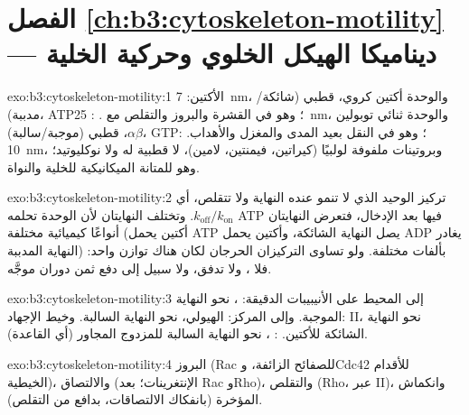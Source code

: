 \section*{الفصل \ref{ch:b3:cytoskeleton-motility} --- ديناميكا الهيكل الخلوي وحركية الخلية}

\begin{solution}{exo:b3:cytoskeleton-motility:1}
الأكتين: \qty{7}{nm}، والوحدة أكتين كروي، قطبي (شائكة/مدببة)، ATP؛
وهو في القشرة والبروز والتقلص مع . : \qty{25}{nm}،
والوحدة ثنائي توبولين $\alpha\beta$، قطبي (موجبة/سالبة)، GTP؛ وهو في النقل
بعيد المدى والمغزل والأهداب. : \qty{10}{nm}،
وبروتينات ملفوفة لولبيًا (كيراتين، فيمنتين، لامين)، لا قطبية له ولا نوكليوتيد؛
وهو للمتانة الميكانيكية للخلية والنواة.
\end{solution}

\begin{solution}{exo:b3:cytoskeleton-motility:2}
تركيز الوحيد الذي لا تنمو عنده النهاية ولا تتقلص،
أي $k_{\text{off}}/k_{\text{on}}$. وتختلف النهايتان لأن الوحدة
تحلمه ATP فيها بعد الإدخال، فتعرض النهايتان أنواعًا
كيميائية مختلفة (أكتين يحمل ATP يصل النهاية الشائكة، وأكتين يحمل ADP
يغادر النهاية المدببة) بألفات مختلفة. ولو تساوى التركيزان
الحرجان لكان هناك توازن واحد: فلا ،
ولا تدفق، ولا سبيل إلى دفع ثمن دوران موجَّه.
\end{solution}

\begin{solution}{exo:b3:cytoskeleton-motility:3}
إلى المحيط على الأنيبيبات الدقيقة: ، نحو النهاية الموجبة. وإلى المركز:
 الهيولي، نحو النهاية السالبة. وخيط الإجهاد:  II،
نحو النهاية الشائكة للأكتين. : ، نحو
النهاية السالبة للمزدوج المجاور (أي القاعدة).
\end{solution}

\begin{solution}{exo:b3:cytoskeleton-motility:4}
البروز (Rac للصفائح الزائفة، وCdc42 للأقدام الخيطية)، والالتصاق
(الإنتغرينات؛ بعد Rac وRho)، والتقلص (Rho، عبر
 II)، وانكماش المؤخرة (بانفكاك الالتصاقات، بدافع من
التقلص).
\end{solution}

